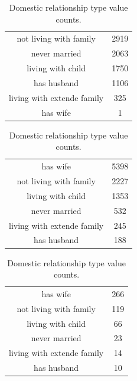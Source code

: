 \begin{table}[!h]
    \caption{Domestic relationship type value counts.}
    \label{tab:domestic-relationship-type}

    \begin{subtable}[ht]{.5\textwidth}
        \centering
        \begin{tabular}{cc}
            not living with family & 2919 \\
            never married & 2063 \\
            living with child & 1750 \\
            has husband & 1106 \\
            living with extende family & 325 \\
            has wife & 1 \\
        \end{tabular}
    \end{subtable}
    \begin{subtable}[ht]{.5\textwidth}
        \centering
        \begin{tabular}{cc}
            has wife & 5398 \\
            not living with family & 2227 \\
            living with child & 1353 \\
            never married & 532 \\
            living with extende family & 245 \\
            has husband & 188 \\
        \end{tabular}
    \end{subtable}

    \vspace{5mm}

    \begin{subtable}[ht]{.5\textwidth}
        \centering
        \begin{tabular}{cc}
            has wife & 266 \\
            not living with family & 119 \\
            living with child & 66 \\
            never married & 23 \\
            living with extende family & 14 \\
            has husband & 10 \\
        \end{tabular}
    \end{subtable}
\end{table}


